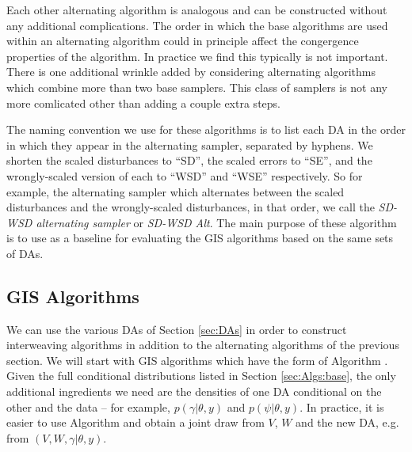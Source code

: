 \documentclass[12pt]{article}
\begin{document}
Each other alternating algorithm is analogous and can be constructed without any additional complications. The order in which the base algorithms are used within an alternating algorithm could in principle affect the congergence properties of the algorithm. In practice we find this typically is not important. There is one additional wrinkle added by considering alternating algorithms which combine more than two base samplers. This class of samplers is not any more comlicated other than adding a couple extra steps. 


The naming convention we use for these algorithms is to list each DA in the order in which they appear in the alternating sampler, separated by hyphens. We shorten the scaled disturbances to ``SD'', the scaled errors to ``SE'', and the wrongly-scaled version of each to ``WSD'' and ``WSE'' respectively. So for example, the alternating sampler which alternates between the scaled disturbances and the wrongly-scaled disturbances, in that order, we call the {\it SD-WSD alternating sampler} or {\it SD-WSD Alt}. The main purpose of these algorithm is to use as a baseline for evaluating the GIS algorithms based on the same sets of DAs.

\subsection{GIS Algorithms}\label{sec:Algs:GIS}
We can use the various DAs of Section \ref{sec:DAs} in order to construct interweaving algorithms in addition to the alternating algorithms of the previous section. We will start with GIS algorithms which have the form of Algorithm . Given the full conditional distributions listed in Section \ref{sec:Algs:base}, the only additional ingredients we need are the densities of one DA conditional on the other and the data -- for example, $p(\gamma|\theta,y)$ and $p(\psi|\theta,y)$. In practice, it is easier to use Algorithm  and obtain a joint draw from $V$, $W$ and the new DA, e.g. from $(V,W,\gamma|\theta,y)$.
\end{document}
